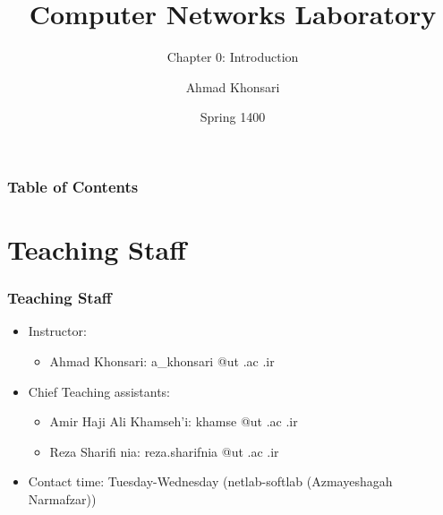 \documentclass[aspectratio=169,15pt]{beamer}
\title{Computer Networks Laboratory}
\subtitle{Chapter 0: Introduction}
\author{Ahmad Khonsari}
\institute[ECE @ UT]{
    Electrical and Computer Engineering Department\\
    Tehran University \newline
    \url{http://ece.ut.ac.ir/}
}
\date{Spring 1400}
\begin{document}
\frame{\titlepage}


\begin{frame}
    \frametitle{Table of Contents}
    \tableofcontents
\end{frame}

\section{Teaching Staff}
\begin{frame}
    \frametitle{Teaching Staff}
    \begin{itemize}
        \item Instructor:
              \begin{itemize}
                  \item Ahmad Khonsari: \alert{a\_khonsari @ut .ac .ir}
              \end{itemize}
        \item Chief Teaching assistants:
              \begin{itemize}
                  \item Amir Haji Ali Khamseh’i: \alert{khamse @ut .ac .ir}
                  \item Reza Sharifi nia: \alert{reza.sharifnia @ut .ac .ir}
              \end{itemize}
        \item Contact time: Tuesday-Wednesday (netlab-softlab (Azmayeshagah Narmafzar))
    \end{itemize}

\end{frame}
\end{document}
